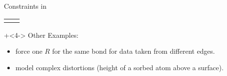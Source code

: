 \begin{slide}{ Constraints in {\feffit} }
\begin{tabular}{ll}
\begin{minipage}{65mm}
\end{minipage}\\
\end{tabular}    

\vmm \vmm

\onslide+<4-> Other Examples:

\begin{itemize} 
\item force one $R$ for the same bond for data taken from different  edges.
\item model complex distortions (height of a sorbed atom above a surface).
\end{itemize}
 
\end{slide}



